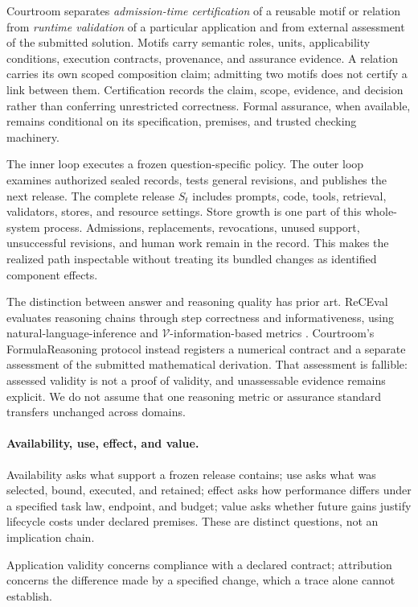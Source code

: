 \documentclass[10pt]{article} %
\providecommand{\1}{\mathbf{1}}  %
\theoremstyle{remark}
\theoremstyle{definition}
\begin{document}
Courtroom separates \emph{admission-time certification} of a reusable
motif or relation from \emph{runtime validation} of a particular
application and from external assessment of the submitted solution.
Motifs carry semantic roles, units, applicability conditions, execution
contracts, provenance, and assurance evidence. A relation carries its own
scoped composition claim; admitting two motifs does not certify a link
between them. Certification records the claim, scope, evidence, and
decision rather than conferring unrestricted correctness. Formal
assurance, when available, remains conditional on its specification,
premises, and trusted checking machinery.

The inner loop executes a frozen question-specific policy. The outer
loop examines authorized sealed records, tests general revisions, and
publishes the next release. The complete release $S_t$ includes prompts,
code, tools, retrieval, validators, stores, and resource settings. Store
growth is one part of this whole-system process. Admissions,
replacements, revocations, unused support, unsuccessful revisions, and
human work remain in the record. This makes the realized path
inspectable without treating its bundled changes as identified component
effects.

The distinction between answer and reasoning quality has prior art.
ReCEval evaluates reasoning chains through step correctness and
informativeness, using natural-language-inference and
$\mathcal V$-information-based metrics \citep{prasad2023receval}.
Courtroom's FormulaReasoning protocol instead registers a numerical
contract and a separate assessment of the submitted mathematical
derivation. That assessment is fallible: assessed validity is not a proof
of validity, and unassessable evidence remains explicit. We do not assume
that one reasoning metric or assurance standard transfers unchanged
across domains.

\paragraph{Availability, use, effect, and value.}

Availability asks what support a frozen release contains; use asks what
was selected, bound, executed, and retained; effect asks how performance
differs under a specified task law, endpoint, and budget; value asks
whether future gains justify lifecycle costs under declared premises.
These are distinct questions, not an implication chain.

Application validity concerns compliance with a declared contract;
attribution concerns the difference made by a specified change, which a
trace alone cannot establish.
\end{document}
